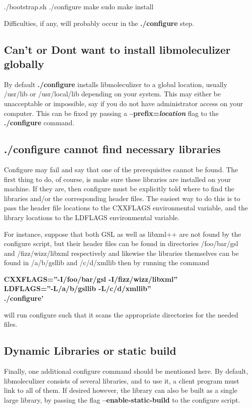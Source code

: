 ./bootstrap.sh
./configure
make
sudo make install

Difficulties, if any, will probably occur in the {\bf ./configure} step.  

\subsection{Can't or Dont want to install libmoleculizer globally}
By default {\bf ./configure} installs libmoleculizer to a global
location, usually /usr/lib or /usr/local/lib depending on your
system.  This may either be unacceptable or impossible, say if you do
not have administrator access on your computer.  This can be fixed py
passing a {\bf --prefix=\emph{location}} flag to the {\bf ./configure}
command.  

\subsection{./configure cannot find necessary libraries}
Configure may fail and say that one of the prerequisites cannot be
found.  The first thing to do, of course, is make sure these libraries
are installed on your machine.  If they are, then configure must be
explicitly told where to find the libraries and/or the corresponding
header files. The easiest way to do this is to pass the header file
locations to the CXXFLAGS environmental variable, and the library
locations to the LDFLAGS environmental variable.  

For instance, suppose that both GSL as well as libxml++ are not found
by the configure script, but their header files can be found in
directories /foo/bar/gsl and /fizz/wizz/libxml respectively and
likewise the libraries themselves can be found in /a/b/gsllib and
/c/d/xmllib then by running the command 

{\bf CXXFLAGS=''-I/foo/bar/gsl
  -I/fizz/wizz/libxml'' \\
LDFLAGS=''-L/a/b/gsllib -L/c/d/xmllib'' \\
  ./configure'} 

will run configure such that it scans the appropriate
  directories for the needed files.  

\subsection{Dynamic Libraries or static build}
Finally, one additional configure command should be mentioned here.
By default, libmoleculizer consists of several libraries, and to use
it, a client program must link to all of them.  If desired however,
the library can also be built as a single large library, by passing
the flag {\bf --enable-static-build} to the configure script.
